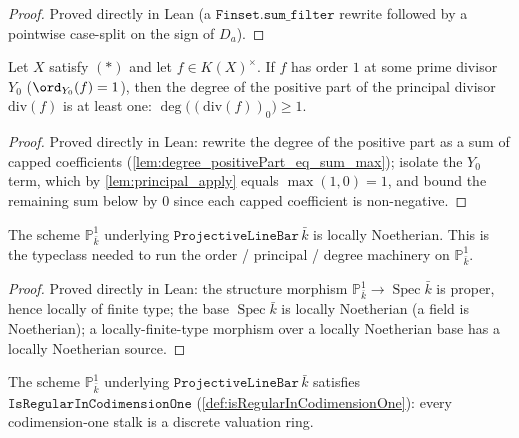 \begin{proof}
  Proved directly in Lean (a \(\texttt{Finset.sum\_filter}\) rewrite followed
  by a pointwise case-split on the sign of \(D_a\)).
\end{proof}
\begin{lemma}

  \label{lem:one_le_degree_positivePart_principal_of_order_one}
  Let \(X\) satisfy \((*)\) and let \(f \in K(X)^{\times}\). If \(f\) has order
  \(1\) at some prime divisor \(Y_0\) (\(\ord_{Y_0}(f) = 1\)), then the degree
  of the positive part of the principal divisor \(\mathrm{div}(f)\) is at least
  one: \(\deg\bigl((\mathrm{div}(f))_0\bigr) \geq 1\).
\end{lemma}
\begin{proof}
  Proved directly in Lean: rewrite the degree of the positive part as a sum of
  capped coefficients (\ref{lem:degree_positivePart_eq_sum_max}); isolate the
  \(Y_0\) term, which by \ref{lem:principal_apply} equals \(\max(1, 0) = 1\),
  and bound the remaining sum below by \(0\) since each capped coefficient is
  non-negative.
\end{proof}
\begin{definition}

  \label{def:projectiveLineBar_isLocallyNoetherian}
  The scheme \(\mathbb P^1_{\bar k}\) underlying \(\texttt{ProjectiveLineBar}\,\bar k\)
  is locally Noetherian. This is the typeclass needed to run the order /
  principal / degree machinery on \(\mathbb P^1_{\bar k}\).
\end{definition}
\begin{proof}
  Proved directly in Lean: the structure morphism \(\mathbb P^1_{\bar k} \to
  \operatorname{Spec}\bar k\) is proper, hence locally of finite type; the base
  \(\operatorname{Spec}\bar k\) is locally Noetherian (a field is Noetherian);
  a locally-finite-type morphism over a locally Noetherian base has a locally
  Noetherian source.
\end{proof}
\begin{theorem}

  \label{thm:projectiveLineBar_isRegularInCodimOne}
  The scheme \(\mathbb P^1_{\bar k}\) underlying \(\texttt{ProjectiveLineBar}\,\bar k\)
  satisfies \(\texttt{IsRegularInCodimensionOne}\)
  (\ref{def:isRegularInCodimensionOne}): every codimension-one stalk is a
  discrete valuation ring.
\end{theorem}
